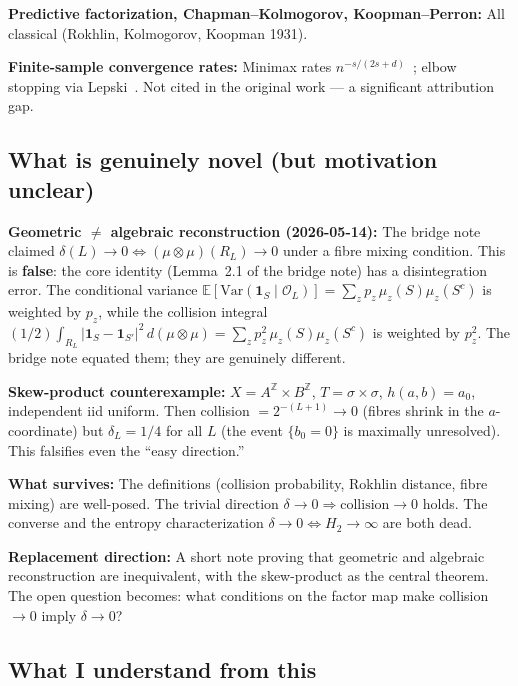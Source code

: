 \textbf{Predictive factorization, Chapman--Kolmogorov, Koopman--Perron:}
All classical (Rokhlin, Kolmogorov, Koopman 1931).

\textbf{Finite-sample convergence rates:} Minimax rates
$n^{-s/(2s+d)}$~\cite{Stone1982}; elbow stopping via
Lepski~\cite{Lepski1991}.  Not cited in the original work ---
a significant attribution gap.

\subsection{What is genuinely novel (but motivation unclear)}

\textbf{Geometric $\neq$ algebraic reconstruction (2026-05-14):}
The bridge note claimed $\delta(L) \to 0 \Leftrightarrow
(\mu \otimes \mu)(R_L) \to 0$ under a fibre mixing condition.
This is \textbf{false}: the core identity (Lemma~2.1 of the
bridge note) has a disintegration error.  The conditional
variance $\mathbb{E}[\mathrm{Var}(\mathbf{1}_S \mid \mathcal{O}_L)]
= \sum_z p_z \,\mu_z(S)\mu_z(S^c)$ is weighted by $p_z$,
while the collision integral $(1/2)\int_{R_L}
|\mathbf{1}_S - \mathbf{1}_{S'}|^2\,d(\mu\otimes\mu)
= \sum_z p_z^2 \,\mu_z(S)\mu_z(S^c)$ is weighted by $p_z^2$.
The bridge note equated them; they are genuinely different.

\textbf{Skew-product counterexample:} $X = A^{\mathbb{Z}} \times
B^{\mathbb{Z}}$, $T = \sigma \times \sigma$, $h(a,b) = a_0$,
independent iid uniform.  Then collision $= 2^{-(L+1)} \to 0$
(fibres shrink in the $a$-coordinate) but $\delta_L = 1/4$ for
all $L$ (the event $\{b_0 = 0\}$ is maximally unresolved).
This falsifies even the ``easy direction.''

\textbf{What survives:} The definitions (collision probability,
Rokhlin distance, fibre mixing) are well-posed.
The trivial direction $\delta \to 0 \Rightarrow
\text{collision} \to 0$ holds.  The converse and the entropy
characterization $\delta \to 0 \Leftrightarrow H_2 \to \infty$
are both dead.

\textbf{Replacement direction:} A short note proving that
geometric and algebraic reconstruction are inequivalent,
with the skew-product as the central theorem.  The open
question becomes: what conditions on the factor map make
collision $\to 0$ imply $\delta \to 0$?

\subsection{What I understand from this}

